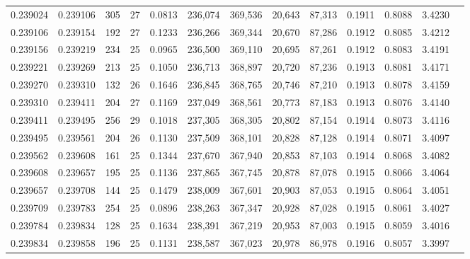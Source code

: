 \begin{tabular}{rrrrrrrrrrrrr}
0.239024 & 0.239106 &   305 &  27 &                                     0.0813 & 236,074 & 369,536 &  20,643 &  87,313 & 0.1911 & 0.8088 & 3.4230 \\
0.239106 & 0.239154 &   192 &  27 &                                     0.1233 & 236,266 & 369,344 &  20,670 &  87,286 & 0.1912 & 0.8085 & 3.4212 \\
0.239156 & 0.239219 &   234 &  25 &                                     0.0965 & 236,500 & 369,110 &  20,695 &  87,261 & 0.1912 & 0.8083 & 3.4191 \\
0.239221 & 0.239269 &   213 &  25 &                                     0.1050 & 236,713 & 368,897 &  20,720 &  87,236 & 0.1913 & 0.8081 & 3.4171 \\
0.239270 & 0.239310 &   132 &  26 &                                     0.1646 & 236,845 & 368,765 &  20,746 &  87,210 & 0.1913 & 0.8078 & 3.4159 \\
0.239310 & 0.239411 &   204 &  27 &                                     0.1169 & 237,049 & 368,561 &  20,773 &  87,183 & 0.1913 & 0.8076 & 3.4140 \\
0.239411 & 0.239495 &   256 &  29 &                                     0.1018 & 237,305 & 368,305 &  20,802 &  87,154 & 0.1914 & 0.8073 & 3.4116 \\
0.239495 & 0.239561 &   204 &  26 &                                     0.1130 & 237,509 & 368,101 &  20,828 &  87,128 & 0.1914 & 0.8071 & 3.4097 \\
0.239562 & 0.239608 &   161 &  25 &                                     0.1344 & 237,670 & 367,940 &  20,853 &  87,103 & 0.1914 & 0.8068 & 3.4082 \\
0.239608 & 0.239657 &   195 &  25 &                                     0.1136 & 237,865 & 367,745 &  20,878 &  87,078 & 0.1915 & 0.8066 & 3.4064 \\
0.239657 & 0.239708 &   144 &  25 &                                     0.1479 & 238,009 & 367,601 &  20,903 &  87,053 & 0.1915 & 0.8064 & 3.4051 \\
0.239709 & 0.239783 &   254 &  25 &                                     0.0896 & 238,263 & 367,347 &  20,928 &  87,028 & 0.1915 & 0.8061 & 3.4027 \\
0.239784 & 0.239834 &   128 &  25 &                                     0.1634 & 238,391 & 367,219 &  20,953 &  87,003 & 0.1915 & 0.8059 & 3.4016 \\
0.239834 & 0.239858 &   196 &  25 &                                     0.1131 & 238,587 & 367,023 &  20,978 &  86,978 & 0.1916 & 0.8057 & 3.3997 \\

\end{tabular}
